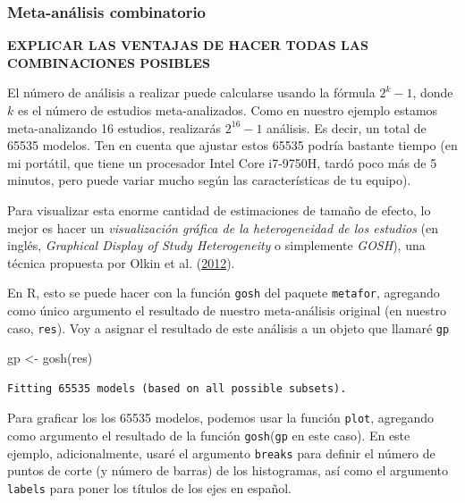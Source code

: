 \documentclass[
  bookmarksnumbered]{article}
\newenvironment{Shaded}{\begin{snugshade}}{\end{snugshade}}
\newcommand{\FunctionTok}[1]{\textcolor[rgb]{0.39,0.29,0.61}{#1}}
\newcommand{\NormalTok}[1]{\textcolor[rgb]{0.12,0.11,0.11}{#1}}
\newcommand{\OtherTok}[1]{\textcolor[rgb]{0.00,0.43,0.16}{#1}}
\begin{document}
\hypertarget{meta-anuxe1lisis-combinatorio}{%
\subsubsection{Meta-análisis combinatorio}\label{meta-anuxe1lisis-combinatorio}}

\textbf{EXPLICAR LAS VENTAJAS DE HACER TODAS LAS COMBINACIONES POSIBLES}

El número de análisis a realizar puede calcularse usando la fórmula \(2^k - 1\), donde \(k\) es el número de estudios meta-analizados. Como en nuestro ejemplo estamos meta-analizando 16 estudios, realizarás \(2^{16} - 1\) análisis. Es decir, un total de 65535 modelos. Ten en cuenta que ajustar estos 65535 podría bastante tiempo (en mi portátil, que tiene un procesador Intel Core i7-9750H, tardó poco más de 5 minutos, pero puede variar mucho según las características de tu equipo).

Para visualizar esta enorme cantidad de estimaciones de tamaño de efecto, lo mejor es hacer un \emph{visualización gráfica de la heterogeneidad de los estudios} (en inglés, \emph{Graphical Display of Study Heterogeneity} o simplemente \emph{GOSH}), una técnica propuesta por Olkin et al. (\protect\hyperlink{ref-olkinGOSHGraphicalDisplay2012}{2012}).

En R, esto se puede hacer con la función \texttt{gosh} del paquete \texttt{metafor}, agregando como único argumento el resultado de nuestro meta-análisis original (en nuestro caso, \texttt{res}). Voy a asignar el resultado de este análisis a un objeto que llamaré \texttt{gp}

\begin{Shaded}
\begin{Highlighting}[]
\NormalTok{gp }\OtherTok{\textless{}{-}} \FunctionTok{gosh}\NormalTok{(res)}
\end{Highlighting}
\end{Shaded}

\begin{verbatim}
Fitting 65535 models (based on all possible subsets).
\end{verbatim}

Para graficar los los 65535 modelos, podemos usar la función \texttt{plot}, agregando como argumento el resultado de la función \texttt{gosh}(\texttt{gp} en este caso). En este ejemplo, adicionalmente, usaré el argumento \texttt{breaks} para definir el número de puntos de corte (y número de barras) de los histogramas, así como el argumento \texttt{labels} para poner los títulos de los ejes en español.
\end{document}
